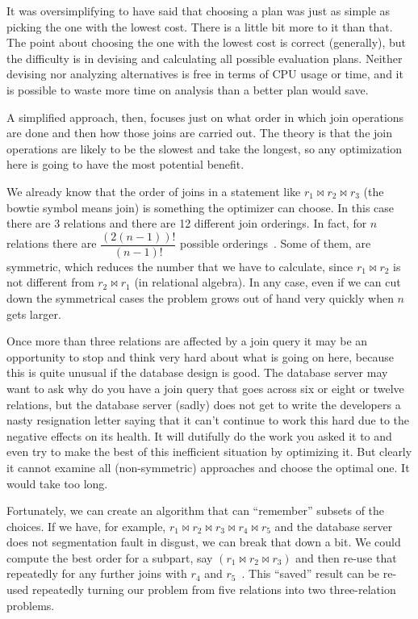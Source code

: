 It was oversimplifying to have said that choosing a plan was just as simple as picking the one with the lowest cost. There is a little bit more to it than that. The point about choosing the one with the lowest cost is correct (generally), but the difficulty is in devising and calculating all possible evaluation plans. Neither devising nor analyzing alternatives is free in terms of CPU usage or time, and it is possible to waste more time on analysis than a better plan would save. 

A simplified approach, then, focuses just on what order in which join operations are done and then how those joins are carried out. The theory is that the join operations are likely to be the slowest and take the longest, so any optimization here is going to have the most potential benefit.

We already know that the order of joins in a statement like $r_{1} \bowtie r_{2} \bowtie r_{3}$ (the bowtie symbol means join) is something the optimizer can choose. In this case there are 3 relations and there are 12 different join orderings. In fact, for $n$ relations there are $\dfrac{(2(n-1))!}{(n-1)!}$ possible orderings~\cite{dsc}. Some of them, are symmetric, which reduces the number that we have to calculate, since $r_{1} \bowtie r_{2}$ is not different from $r_{2} \bowtie r_{1}$ (in relational algebra). In any case, even if we can cut down the symmetrical cases the problem grows out of hand very quickly when $n$ gets larger. 

Once more than three relations are affected by a join query it may be an opportunity to stop and think very hard about what is going on here, because this is quite unusual if the database design is good. The database server may want to ask why do you have a join query that goes across six or eight or twelve relations, but the database server (sadly) does not get to write the developers a nasty resignation letter saying that it can't continue to work this hard due to the negative effects on its health. It will dutifully do the work you asked it to and even try to make the best of this inefficient situation by optimizing it. But clearly it cannot examine all (non-symmetric) approaches and choose the optimal one. It would take too long.

Fortunately, we can create an algorithm that can ``remember'' subsets of the choices. If we have, for example, $r_{1} \bowtie r_{2} \bowtie r_{3} \bowtie r_{4} \bowtie r_{5}$ and the database server does not segmentation fault in disgust, we can break that down a bit. We could compute the best order for a subpart, say $(r_{1} \bowtie r_{2} \bowtie r_{3})$ and then re-use that repeatedly for any further joins with $r_{4}$ and $r_{5}$~\cite{dsc}. This ``saved'' result can be re-used repeatedly turning our problem from five relations into two three-relation problems.

